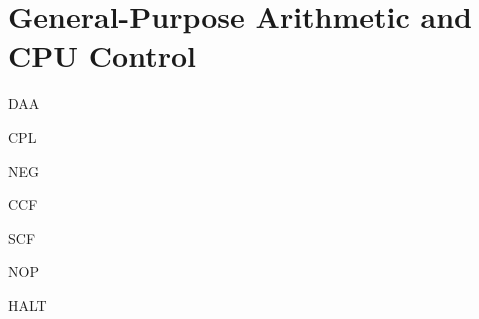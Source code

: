 \section{General-Purpose Arithmetic and CPU Control}

\begin{minipage}{\textwidth}

\begin{instrtable}

    \begin{instruction}{DAA}
        \Symbol{}
            \FlagsDAA
    \end{instruction}

    \begin{instruction}{CPL} 
        \Symbol{\SymCPL}
            \FlagsCPL
    \end{instruction}

    \begin{instruction}{NEG} 
        \Symbol{\SymNEG}
            \FlagsNEG
        \SkipToOpCode 
    \end{instruction}

    \begin{instruction}{CCF} 
        \Symbol{\SymCCF}
            \FlagsCCF
    \end{instruction}

    \begin{instruction}{SCF} 
        \Symbol{\SymSCF}
            \FlagsSCF
    \end{instruction}

    \begin{instruction}{NOP}
        \Symbol{}
            \FlagsNOP
    \end{instruction}

    \begin{instruction}{HALT}
        \Symbol{}
            \FlagsHALT
    \end{instruction}


\end{instrtable}
\end{minipage}
